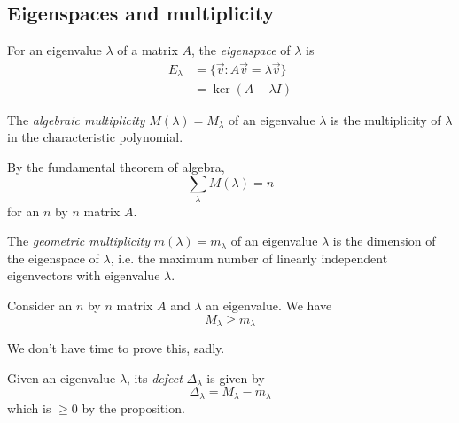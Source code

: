 \documentclass{../../template/note}
\begin{document}
    \subsection{Eigenspaces and multiplicity}

    \begin{definition}
        For an eigenvalue \(\lambda\) of a matrix \(A\), the \emph{eigenspace} of \(\lambda\) is
        \begin{align*}
            E_\lambda &= \{\vec v : A \vec v = \lambda \vec v\} \\
            &= \ker(A - \lambda I)
        \end{align*}
    \end{definition}
    
    \begin{definition}
        The \emph{algebraic multiplicity} \(M(\lambda) = M_\lambda\) of an eigenvalue \(\lambda\) is the multiplicity of \(\lambda\) in the characteristic polynomial.
    \end{definition}
    
    \begin{remark*}
        By the fundamental theorem of algebra,
        \[
            \sum_\lambda M(\lambda) = n
        \]
        for an \(n\) by \(n\) matrix \(A\).
    \end{remark*}
    
    \begin{definition}
        The \emph{geometric multiplicity} \(m(\lambda) = m_\lambda\) of an eigenvalue \(\lambda\) is the dimension of the eigenspace of \(\lambda\), i.e. the maximum number of linearly independent eigenvectors with eigenvalue \(\lambda\).
    \end{definition}
    
    \begin{proposition}
        Consider an \(n\) by \(n\) matrix \(A\) and \(\lambda\) an eigenvalue. We have
        \[
            M_\lambda \geq m_\lambda
        \]
        \label{geometric-algebraic-multiplicity}
    \end{proposition}
    We don't have time to prove this, sadly.
    
    \begin{definition}
        Given an eigenvalue \(\lambda\), its \emph{defect} \(\Delta_\lambda\) is given by
        \[
            \Delta_\lambda = M_\lambda - m_\lambda
        \]
        which is \(\geq 0\) by the proposition.
    \end{definition}
    
\end{document}
